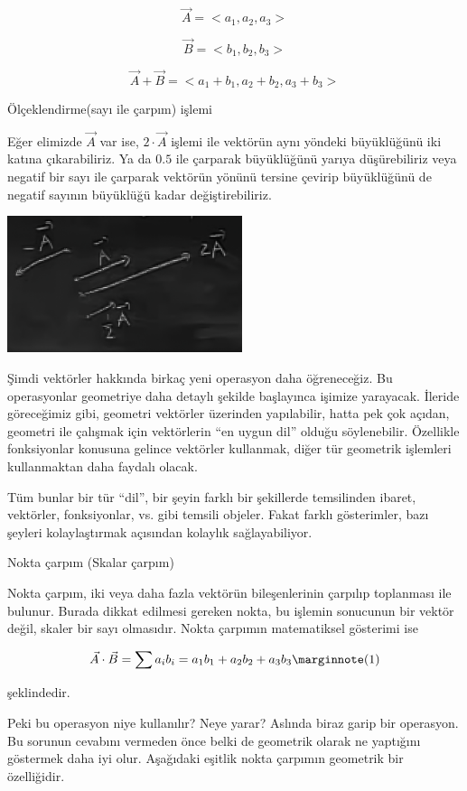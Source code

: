 \documentclass[12pt,fleqn]{article}\usepackage{../../common}
\begin{document}
$$ \vec{A} = < a_1, a_2, a_3 > $$

$$ \vec{B} = < b_1, b_2, b_3 > $$

$$ \vec{A} + \vec{B} = < a_1+b_1, a_2+b_2, a_3+b_3 > $$

Ölçeklendirme(sayı ile çarpım) işlemi

Eğer elimizde $\vec{A}$ var ise, $2 \cdot \vec{A}$ işlemi ile vektörün aynı 
yöndeki büyüklüğünü iki katına çıkarabiliriz. Ya da $0.5$ ile çarparak 
büyüklüğünü yarıya düşürebiliriz veya negatif bir sayı ile çarparak vektörün 
yönünü tersine çevirip büyüklüğünü de negatif sayının büyüklüğü kadar 
değiştirebiliriz.

\includegraphics[height=4cm]{1_10.png}

Şimdi vektörler hakkında birkaç yeni operasyon daha öğreneceğiz. Bu
operasyonlar geometriye daha detaylı şekilde başlayınca işimize
yarayacak. İleride göreceğimiz gibi, geometri vektörler üzerinden
yapılabilir, hatta pek çok açıdan, geometri ile çalışmak için vektörlerin
``en uygun dil'' olduğu söylenebilir. Özellikle fonksiyonlar konusuna
gelince vektörler kullanmak, diğer tür geometrik işlemleri kullanmaktan
daha faydalı olacak. 

Tüm bunlar bir tür ``dil'', bir şeyin farklı bir şekillerde temsilinden
ibaret, vektörler, fonksiyonlar, vs. gibi temsili objeler. Fakat farklı 
gösterimler, bazı şeyleri kolaylaştırmak açısından kolaylık sağlayabiliyor.

Nokta çarpım (Skalar çarpım)

Nokta çarpım, iki veya daha fazla vektörün bileşenlerinin çarpılıp toplanması
ile bulunur. Burada dikkat edilmesi gereken nokta, bu işlemin sonucunun bir
vektör değil, skaler bir sayı olmasıdır. Nokta çarpımın matematiksel gösterimi
ise

$$
\vec{A} \cdot \vec{B} = \sum a_ib_i = a_1b_1 + a_2b_2 + a_3b_3 
\mlabel{1}
$$

şeklindedir.

Peki bu operasyon niye kullanılır? Neye yarar? Aslında biraz garip bir
operasyon. Bu sorunun cevabını vermeden önce belki de geometrik olarak ne
yaptığını göstermek daha iyi olur. Aşağıdaki eşitlik nokta çarpımın geometrik
bir özelliğidir.
\end{document}
